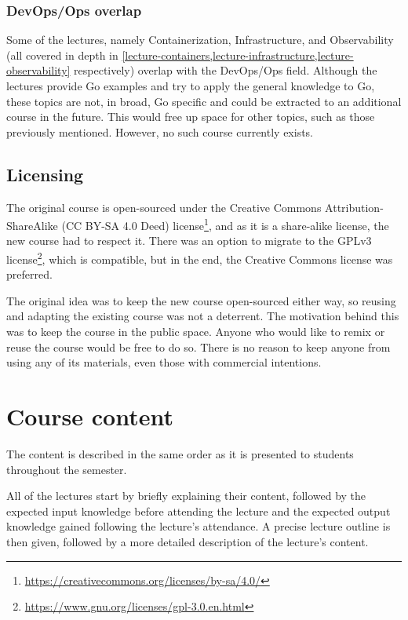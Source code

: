 \documentclass[
  digital,
  color,
  oneside,
  nosansbold,
  nocolorbold,
  nolof,
  nolot,
]{fithesis4}
\begin{document}
\subsection{DevOps/Ops overlap}\label{devops-overlap}

Some of the lectures, namely Containerization, Infrastructure, and Observability (all covered in depth in \cref{lecture-containers,lecture-infrastructure,lecture-observability} respectively) overlap with the DevOps/Ops field. Although the lectures provide Go examples and try to apply the general knowledge to Go, these topics are not, in broad, Go specific and could be extracted to an additional course in the future. This would free up space for other topics, such as those previously mentioned. However, no such course currently exists.

\section{Licensing}

The original course is open-sourced under the Creative Commons Attribution-ShareAlike (CC BY-SA 4.0 Deed) license\footnote{\url{https://creativecommons.org/licenses/by-sa/4.0/}}, and as it is a share-alike license, the new course had to respect it. There was an option to migrate to the GPLv3 license\footnote{\url{https://www.gnu.org/licenses/gpl-3.0.en.html}}, which is compatible, but in the end, the Creative Commons license was preferred.

The original idea was to keep the new course open-sourced either way, so reusing and adapting the existing course was not a deterrent. The motivation behind this was to keep the course in the public space. Anyone who would like to remix or reuse the course would be free to do so. There is no reason to keep anyone from using any of its materials, even those with commercial intentions.

\chapter{Course content}\label{chapter-content}

The content is described in the same order as it is presented to students throughout the semester.

All of the lectures start by briefly explaining their content, followed by the expected input knowledge before attending the lecture and the expected output knowledge gained following the lecture's attendance. A precise lecture outline is then given, followed by a more detailed description of the lecture's content.
\end{document}
